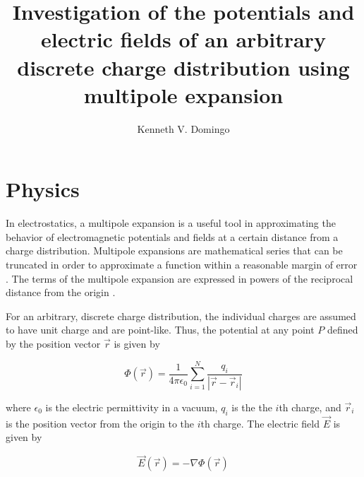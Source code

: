 \documentclass[12pt,a4paper,twoside]{article}
\begin{document}
\title{\TitleFont Investigation of the potentials and electric fields of an arbitrary discrete charge distribution using multipole expansion}

\author[*]{Kenneth V. Domingo\lastauthorsep}


\maketitle
\thispagestyle{titlestyle}

\section{Physics}
\label{sec:Intro}
\medskip
In electrostatics, a multipole expansion is a useful tool in approximating the behavior of electromagnetic potentials and fields at a certain distance from a charge distribution. Multipole expansions are mathematical series that can be truncated in order to approximate a function within a reasonable margin of error \cite{kinzel}. The terms of the multipole expansion are expressed in powers of the reciprocal distance from the origin \cite{griffiths}. 

For an arbitrary, discrete charge distribution, the individual charges are assumed to have unit charge and are point-like. Thus, the potential at any point $P$ defined by the position vector $\vec{r}$ is given by

\begin{equation}\label{eq:potential}
	\Phi(\vec{r}) = \frac{1}{4\pi\epsilon_0} \sum_{i=1}^N \frac{q_i}{|\vec{r} - \vec{r}_i|}
\end{equation}

where $\epsilon_0$ is the electric permittivity in a vacuum, $q_i$ is the the $i$th charge, and $\vec{r}_i$ is the position vector from the origin to the $i$th charge. The electric field $\vec{E}$ is given by

\begin{equation}\label{eq:efield}
	\vec{E}(\vec{r}) =  -\nabla \Phi(\vec{r})
\end{equation}
\end{document}

